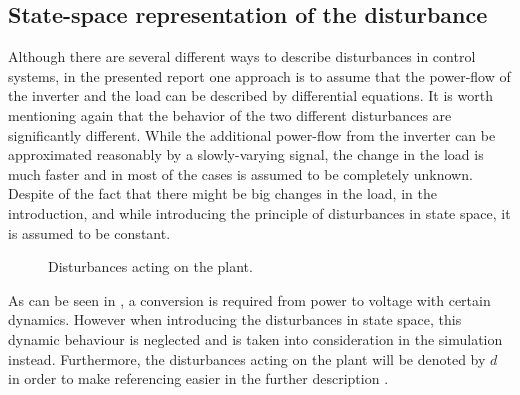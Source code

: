 \subsection{State-space representation of the disturbance}
\label{statespace_disturbance}

Although there are several different ways to describe disturbances in control systems, in the presented report one approach is to assume that the power-flow of the inverter and the load can be described by differential equations. It is worth mentioning again that the behavior of the two different disturbances are significantly different. While the additional power-flow from the inverter can be approximated reasonably by a slowly-varying signal, the change in the load is much faster and in most of the cases is assumed to be completely unknown. Despite of the fact that there might be big changes in the load, in the introduction, and while introducing the principle of disturbances in state space, it is assumed to be constant. 


\begin{figure}[H]
\centering
{}
\caption{Disturbances acting on the plant.}
\label{fig:disturbances}
\end{figure}

As can be seen in , a conversion is required from power to voltage with certain dynamics. However when introducing the disturbances in state space, this dynamic behaviour is neglected and is taken into consideration in the simulation instead. Furthermore, the disturbances acting on the plant will be denoted by $d$ in order to make referencing easier in the further description . 

